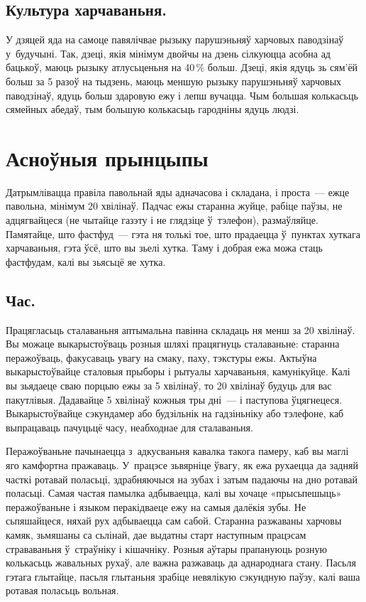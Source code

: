 \subsection{Культура харчаваньня.}
У дзяцей яда на самоце павялічвае рызыку парушэньняў харчовых паводзінаў у~будучыні. Так, дзеці, якія мінімум двойчы на дзень сілкуюцца асобна ад бацькоў, маюць рызыку атлусьценьня на 40\,\% больш. Дзеці, якія ядуць зь сям'ёй больш за 5 разоў на тыдзень, маюць меншую рызыку парушэньняў харчовых паводзінаў, ядуць больш здаровую ежу і лепш вучацца. Чым большая колькасьць сямейных абедаў, тым большую колькасьць гародніны ядуць людзі.

\section{Асноўныя прынцыпы}

Датрымлівацца правіла павольнай яды адначасова і складана, і проста~--- ежце павольна, мінімум 20 хвілінаў. Падчас ежы старанна жуйце, рабіце паўзы, не адцягвайцеся (не чытайце газэту і не глядзіце ў~тэлефон), размаўляйце. Памятайце, што фастфуд~--- гэта ня толькі тое, што прадаецца ў~пунктах хуткага харчаваньня, гэта ўсё, што вы зьелі хутка. Таму і добрая ежа можа стаць фастфудам, калі вы зьясьцё яе хутка.


\subsection{Час.}
Працягласьць сталаваньня аптымальна павінна складаць ня менш за 20 хвілінаў. Вы можаце выкарыстоўваць розныя шляхі працягнуць сталаваньне: старанна перажоўваць, факусаваць увагу на смаку, паху, тэкстуры ежы. Актыўна выкарыстоўвайце сталовыя прыборы і рытуалы харчаваньня, камунікуйце. Калі вы зьядаеце сваю порцыю ежы за 5 хвілінаў, то 20 хвілінаў будуць для вас пакутлівыя. Дадавайце 5 хвілінаў кожныя тры дні~--- і паступова ўцягнецеся. Выкарыстоўвайце сэкундамер або будзільнік на гадзіньніку або тэлефоне, каб выпрацаваць пачуцьцё часу, неабходнае для сталаваньня.

Перажоўваньне пачынаецца з~адкусваньня кавалка такога памеру, каб вы маглі яго камфортна пражаваць. У~працэсе зьвярніце ўвагу, як ежа рухаецца да задняй часткі ротавай поласьці, здрабняючыся на зубах і затым падаючы на дно ротавай поласьці. Самая частая памылка адбываецца, калі вы хочаце «прысьпешыць» перажоўваньне і языком перакідваеце ежу на самыя далёкія зубы. Не сьпяшайцеся, няхай рух адбываецца сам сабой. Старанна разжаваны харчовы камяк, зьмяшаны са сьлінай, дае выдатны старт наступным працэсам страваваньня ў~страўніку і кішачніку. Розныя аўтары прапануюць розную колькасьць жавальных рухаў, але важна разжаваць да аднароднага стану. Пасьля гэтага глытайце, пасьля глытаньня зрабіце невялікую сэкундную паўзу, калі ваша ротавая поласьць вольная.

